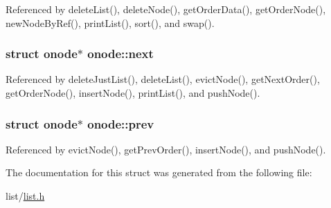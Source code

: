 Referenced by delete\-List(), delete\-Node(), get\-Order\-Data(), get\-Order\-Node(), new\-Node\-By\-Ref(), print\-List(), sort(), and swap().

\hypertarget{structonode_ac9704e6f9b12c04f52e61c856f8c1e29}{
\subsubsection[{next}]{\setlength{\rightskip}{0pt plus 5cm}struct {\bf onode}$\ast$ onode\-::next}}\label{structonode_ac9704e6f9b12c04f52e61c856f8c1e29}


Referenced by delete\-Just\-List(), delete\-List(), evict\-Node(), get\-Next\-Order(), get\-Order\-Node(), insert\-Node(), print\-List(), and push\-Node().

\hypertarget{structonode_a597f99367f877e2e4a9cafe4be30e837}{
\subsubsection[{prev}]{\setlength{\rightskip}{0pt plus 5cm}struct {\bf onode}$\ast$ onode\-::prev}}\label{structonode_a597f99367f877e2e4a9cafe4be30e837}


Referenced by evict\-Node(), get\-Prev\-Order(), insert\-Node(), and push\-Node().



The documentation for this struct was generated from the following file\-:\begin{DoxyCompactItemize}
\item 
list/\hyperlink{list_8h}{list.\-h}\end{DoxyCompactItemize}
